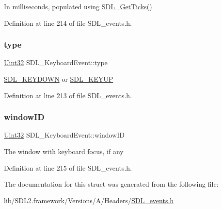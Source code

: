 In milliseconds, populated using \mbox{\hyperlink{_s_d_l__timer_8h_a0b9bc71d6287e0ffafdc3419760fe2b3}{S\+D\+L\+\_\+\+Get\+Ticks()}} 

Definition at line 214 of file S\+D\+L\+\_\+events.\+h.

\mbox{\label{struct_s_d_l___keyboard_event_ae0b2f2aace6f80c1f47e5a14350d409a}} 
\subsubsection{\texorpdfstring{type}{type}}
{\footnotesize\ttfamily \mbox{\hyperlink{_s_d_l__stdinc_8h_add440eff171ea5f55cb00c4a9ab8672d}{Uint32}} S\+D\+L\+\_\+\+Keyboard\+Event\+::type}

\mbox{\hyperlink{_s_d_l__events_8h_a3b589e89be6b35c02e0dd34a55f3fccaacaf8cfd53c985cdbf6a90c811d51a1fc}{S\+D\+L\+\_\+\+K\+E\+Y\+D\+O\+WN}} or \mbox{\hyperlink{_s_d_l__events_8h_a3b589e89be6b35c02e0dd34a55f3fccaadefb8866b9d28be21c2c33c35cc66c4b}{S\+D\+L\+\_\+\+K\+E\+Y\+UP}} 

Definition at line 213 of file S\+D\+L\+\_\+events.\+h.

\mbox{\label{struct_s_d_l___keyboard_event_a56efb6780b96acd5b50d8f797efb3546}} 
\subsubsection{\texorpdfstring{windowID}{windowID}}
{\footnotesize\ttfamily \mbox{\hyperlink{_s_d_l__stdinc_8h_add440eff171ea5f55cb00c4a9ab8672d}{Uint32}} S\+D\+L\+\_\+\+Keyboard\+Event\+::window\+ID}

The window with keyboard focus, if any 

Definition at line 215 of file S\+D\+L\+\_\+events.\+h.



The documentation for this struct was generated from the following file\+:\begin{DoxyCompactItemize}
\item 
lib/\+S\+D\+L2.\+framework/\+Versions/\+A/\+Headers/\mbox{\hyperlink{_s_d_l__events_8h}{S\+D\+L\+\_\+events.\+h}}\end{DoxyCompactItemize}
